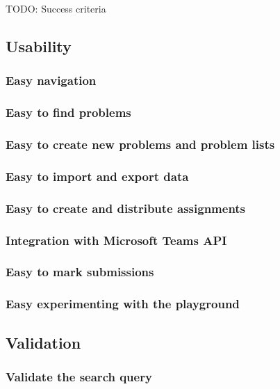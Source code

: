 \documentclass[a4paper]{report}
\begin{document}
TODO: Success criteria

\subsection{Usability}

\subsubsection{Easy navigation}

\subsubsection{Easy to find problems}

\subsubsection{Easy to create new problems and problem lists}

\subsubsection{Easy to import and export data}

\subsubsection{Easy to create and distribute assignments}

\subsubsection{Integration with Microsoft Teams API}

\subsubsection{Easy to mark submissions}

\subsubsection{Easy experimenting with the playground}

\subsection{Validation}

\subsubsection{Validate the search query}
\end{document}
